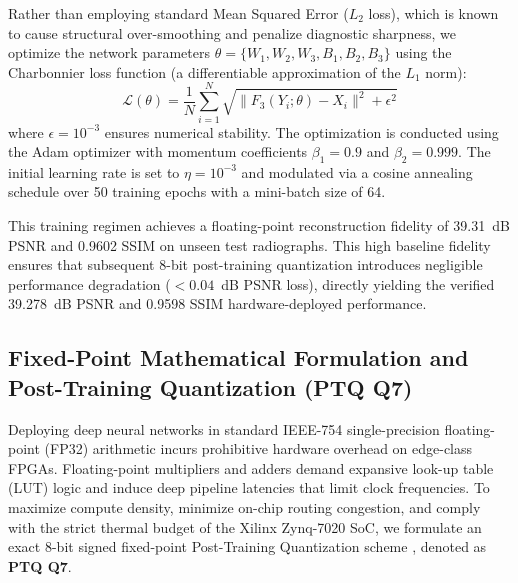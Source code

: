 \documentclass[conference]{IEEEtran}
\begin{document}
Rather than employing standard Mean Squared Error ($L_2$ loss), which is known to cause structural over-smoothing and penalize diagnostic sharpness, we optimize the network parameters $\theta = \{W_1, W_2, W_3, B_1, B_2, B_3\}$ using the Charbonnier loss function \cite{charbonnier1994two} (a differentiable approximation of the $L_1$ norm):
\begin{equation}
\mathcal{L}(\theta) = \frac{1}{N} \sum_{i=1}^N \sqrt{\| F_3(Y_i; \theta) - X_i \|^2 + \epsilon^2}
\label{eq:charbonnier_loss}
\end{equation}
where $\epsilon = 10^{-3}$ ensures numerical stability. The optimization is conducted using the Adam optimizer \cite{kingma2014adam} with momentum coefficients $\beta_1 = 0.9$ and $\beta_2 = 0.999$. The initial learning rate is set to $\eta = 10^{-3}$ and modulated via a cosine annealing schedule over 50 training epochs with a mini-batch size of 64. 

This training regimen achieves a floating-point reconstruction fidelity of 39.31~dB PSNR and 0.9602 SSIM on unseen test radiographs. This high baseline fidelity ensures that subsequent 8-bit post-training quantization introduces negligible performance degradation ($<0.04$~dB PSNR loss), directly yielding the verified 39.278~dB PSNR and 0.9598 SSIM hardware-deployed performance.

\subsection{Fixed-Point Mathematical Formulation and Post-Training Quantization (PTQ Q7)}
\label{sec:quantization}
\label{sec:ptq}

Deploying deep neural networks in standard IEEE-754 single-precision floating-point (FP32) arithmetic incurs prohibitive hardware overhead on edge-class FPGAs. Floating-point multipliers and adders demand expansive look-up table (LUT) logic and induce deep pipeline latencies that limit clock frequencies. To maximize compute density, minimize on-chip routing congestion, and comply with the strict thermal budget of the Xilinx Zynq-7020 SoC, we formulate an exact 8-bit signed fixed-point Post-Training Quantization scheme \cite{jacob2018quantization, sze2017efficient}, denoted as \textbf{PTQ Q7}.
\end{document}
